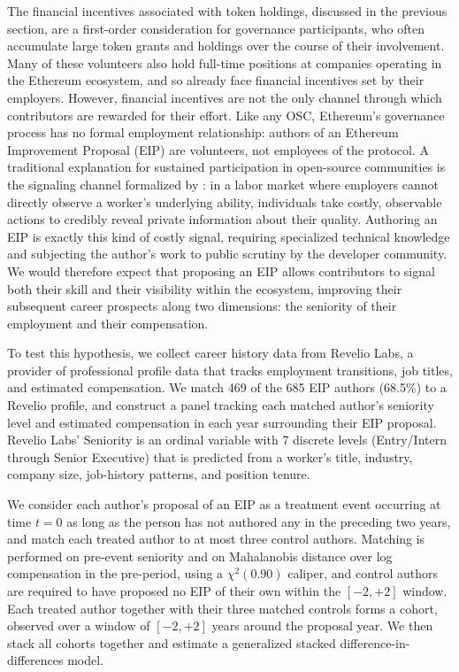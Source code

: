 \documentclass[No]{AEA}
\begin{document}
The financial incentives associated with token holdings, discussed in the previous section, are a first-order consideration for governance participants, who often accumulate large token grants and holdings over the course of their involvement. Many of these volunteers also hold full-time positions at companies operating in the Ethereum ecosystem, and so already face financial incentives set by their employers. However, financial incentives are not the only channel through which contributors are rewarded for their effort. Like any OSC, Ethereum's governance process has no formal employment relationship: authors of an Ethereum Improvement Proposal (EIP) are volunteers, not employees of the protocol. A traditional explanation for sustained participation in open-source communities is the signaling channel formalized by \cite{Spence1973}: in a labor market where employers cannot directly observe a worker's underlying ability, individuals take costly, observable actions to credibly reveal private information about their quality. Authoring an EIP is exactly this kind of costly signal, requiring specialized technical knowledge and subjecting the author's work to public scrutiny by the developer community. We would therefore expect that proposing an EIP allows contributors to signal both their skill and their visibility within the ecosystem, improving their subsequent career prospects along two dimensions: the seniority of their employment and their compensation. 

To test this hypothesis, we collect career history data from Revelio Labs, a provider of professional profile data that tracks employment transitions, job titles, and estimated compensation. We match 469 of the 685 EIP authors (68.5\%) to a Revelio profile, and construct a panel tracking each matched author's seniority level and estimated compensation in each year surrounding their EIP proposal. Revelio Labs' Seniority is an ordinal variable with 7 discrete levels (Entry/Intern through Senior Executive) that is predicted from a worker's title, industry, company size, job-history patterns, and position tenure.

We consider each author's proposal of an EIP as a treatment event occurring at time $t=0$ as long as the person has not authored any in
the preceding two years, and match each treated author to at most three control authors. Matching is performed on pre-event seniority and on Mahalanobis distance over log compensation in the pre-period, using a $\chi^2(0.90)$ caliper, and control authors are required to have proposed no EIP of their own within the $[-2,+2]$ window. Each treated author together with their three matched controls forms a cohort, observed over a window of $[-2,+2]$ years around the proposal year. We then stack all cohorts together and estimate a generalized stacked difference-in-differences model.
\end{document}
